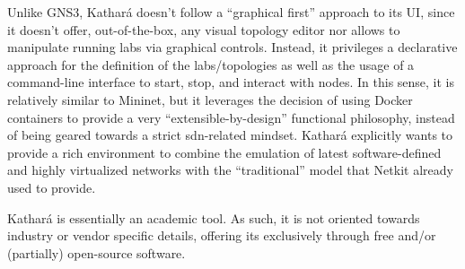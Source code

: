 Unlike GNS3, Kathará doesn't follow a ``graphical first'' approach to its UI, since it doesn't offer, out-of-the-box, any visual topology editor nor allows to manipulate running labs via graphical controls.
Instead, it privileges a declarative approach for the definition of the labs/topologies as well as the usage of a command-line interface to start, stop, and interact with nodes.
In this sense, it is relatively similar to Mininet, but it leverages the decision of using Docker containers to provide a very ``extensible-by-design'' functional philosophy, instead of being geared towards a strict \gls{sdn}-related mindset.
Kathará explicitly wants to provide a rich environment to combine the emulation of latest software-defined and highly virtualized networks with the ``traditional'' model that Netkit already used to provide.

Kathará is essentially an academic tool.
As such, it is not oriented towards industry or vendor specific details, offering its exclusively through free and/or (partially) open-source software.

